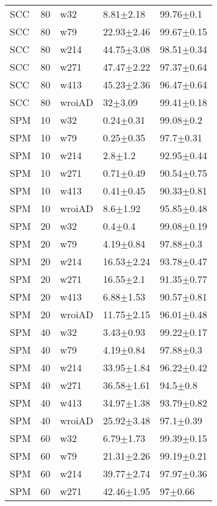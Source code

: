 \begin{table}[ht]
\begin{center}
\begin{tabular}{lllll}
  SCC & 80 & w32 & 8.81$\pm$2.18 & 99.76$\pm$0.1 \\ 
  SCC & 80 & w79 & 22.93$\pm$2.46 & 99.67$\pm$0.15 \\ 
  SCC & 80 & w214 & 44.75$\pm$3.08 & 98.51$\pm$0.34 \\ 
  SCC & 80 & w271 & 47.47$\pm$2.22 & 97.37$\pm$0.64 \\ 
  SCC & 80 & w413 & 45.23$\pm$2.36 & 96.47$\pm$0.64 \\ 
  SCC & 80 & wroiAD & 32$\pm$3.09 & 99.41$\pm$0.18 \\ 
  SPM & 10 & w32 & 0.24$\pm$0.31 & 99.08$\pm$0.2 \\ 
  SPM & 10 & w79 & 0.25$\pm$0.35 & 97.7$\pm$0.31 \\ 
  SPM & 10 & w214 & 2.8$\pm$1.2 & 92.95$\pm$0.44 \\ 
  SPM & 10 & w271 & 0.71$\pm$0.49 & 90.54$\pm$0.75 \\ 
  SPM & 10 & w413 & 0.41$\pm$0.45 & 90.33$\pm$0.81 \\ 
  SPM & 10 & wroiAD & 8.6$\pm$1.92 & 95.85$\pm$0.48 \\ 
  SPM & 20 & w32 & 0.4$\pm$0.4 & 99.08$\pm$0.19 \\ 
  SPM & 20 & w79 & 4.19$\pm$0.84 & 97.88$\pm$0.3 \\ 
  SPM & 20 & w214 & 16.53$\pm$2.24 & 93.78$\pm$0.47 \\ 
  SPM & 20 & w271 & 16.55$\pm$2.1 & 91.35$\pm$0.77 \\ 
  SPM & 20 & w413 & 6.88$\pm$1.53 & 90.57$\pm$0.81 \\ 
  SPM & 20 & wroiAD & 11.75$\pm$2.15 & 96.01$\pm$0.48 \\ 
  SPM & 40 & w32 & 3.43$\pm$0.93 & 99.22$\pm$0.17 \\ 
  SPM & 40 & w79 & 4.19$\pm$0.84 & 97.88$\pm$0.3 \\ 
  SPM & 40 & w214 & 33.95$\pm$1.84 & 96.22$\pm$0.42 \\ 
  SPM & 40 & w271 & 36.58$\pm$1.61 & 94.5$\pm$0.8 \\ 
  SPM & 40 & w413 & 34.97$\pm$1.38 & 93.79$\pm$0.82 \\ 
  SPM & 40 & wroiAD & 25.92$\pm$3.48 & 97.1$\pm$0.39 \\ 
  SPM & 60 & w32 & 6.79$\pm$1.73 & 99.39$\pm$0.15 \\ 
  SPM & 60 & w79 & 21.31$\pm$2.26 & 99.19$\pm$0.21 \\ 
  SPM & 60 & w214 & 39.77$\pm$2.74 & 97.97$\pm$0.36 \\ 
  SPM & 60 & w271 & 42.46$\pm$1.95 & 97$\pm$0.66 \\ 

\end{tabular}
\end{center}
\end{table}
